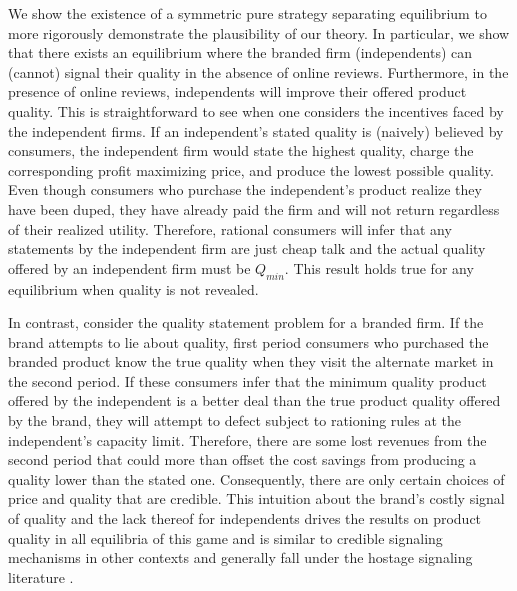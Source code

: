 \documentclass[mksc,blindrev]{informs3} %
\begin{document}
We show the existence of a symmetric pure strategy separating equilibrium to more rigorously demonstrate the plausibility of our theory. In particular, we show that there exists an equilibrium where the branded firm (independents) can (cannot) signal their quality in the absence of online reviews. Furthermore, in the presence of online reviews, independents will improve their offered product quality. This is straightforward  to see when one considers the incentives faced by the independent firms. If an independent's stated quality is (naively) believed by consumers, the independent firm would state the highest quality, charge the corresponding profit maximizing price, and produce the lowest possible quality. Even though consumers who purchase the independent's product realize they have been duped, they have already paid the firm and will not return regardless of their realized utility. Therefore, rational consumers will infer that any statements by the  independent firm are just cheap talk and the actual quality offered by an independent firm must be $Q_{min}$. This result holds true for any equilibrium when quality is not revealed.

In contrast, consider the quality statement problem for a branded firm. If the brand attempts to lie about quality, first period consumers who purchased the branded product know the true quality when they visit the alternate market in the second period. If these consumers infer that the minimum quality product offered by the independent is a better deal than the true product quality offered by the brand, they will attempt to defect subject to rationing rules at the independent's capacity limit. Therefore, there are some lost revenues from the second period that could more than offset the cost savings from producing a quality lower than the stated one. Consequently, there are only certain choices of price and quality that are credible. This intuition about the brand's costly signal of quality and the lack thereof for independents drives the results on product quality in all equilibria of this game and is similar to credible signaling mechanisms in other contexts \citep{spence1978job,milgrom1986price} and generally fall under the hostage signaling literature \citep{williamson1983credible}.
\end{document}
